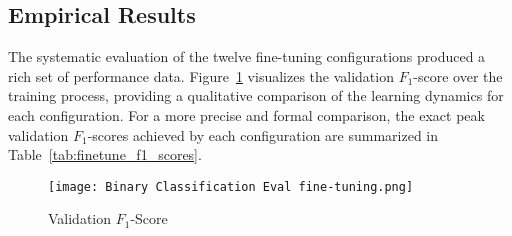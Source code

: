 \subsection{Empirical Results}\label{ch:4.4.2}
The systematic evaluation of the twelve fine-tuning configurations produced a rich set of performance data. Figure~\ref{fig:binaryf1} visualizes the validation \(F_1\)-score over the training process, providing a qualitative comparison of the learning dynamics for each configuration. For a more precise and formal comparison, the exact peak validation \(F_1\)-scores achieved by each configuration are summarized in Table~\ref{tab:finetune_f1_scores}.
\begin{figure}[tb]
    \captionsetup{skip=5pt}
    \centering
    \texttt{[image: Binary Classification Eval fine-tuning.png]}
    \caption{Validation \(F_1\)-Score}
    \label{fig:binaryf1}
\end{figure}
\begin{table}[tb]
    \captionsetup{skip=5pt}
    \centering
    \caption{Peak Validation F1-Score of Fine-Tuning Configurations on BGE Model}
    \label{tab:finetune_f1_scores}
\end{table}

